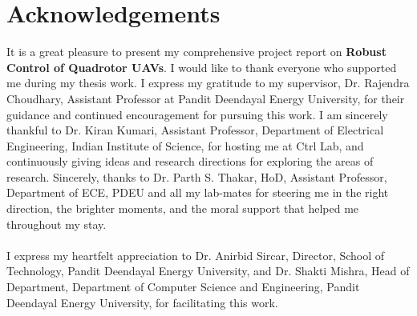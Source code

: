 \chapter*{\center \Large  Acknowledgements}
It is a great pleasure to present my comprehensive project report on \textbf{Robust Control of Quadrotor UAVs}. I would like to thank everyone who supported me during my thesis work. I express my gratitude to my supervisor, Dr. Rajendra Choudhary, Assistant Professor at Pandit Deendayal Energy University, for their guidance and continued encouragement for pursuing this work. I am sincerely thankful to Dr. Kiran Kumari, Assistant Professor, Department of Electrical Engineering, Indian Institute of Science, for hosting me at Ctrl Lab, and continuously giving ideas and research directions for exploring the areas of research. Sincerely, thanks to Dr. Parth S. Thakar, HoD, Assistant Professor, Department of ECE, PDEU and all my lab-mates for steering me in the right direction, the brighter moments, and the moral support that helped me throughout my stay.
\\
\\
\noindent
I express my heartfelt appreciation to Dr. Anirbid Sircar, Director, School of Technology, Pandit Deendayal Energy University, and Dr. Shakti Mishra, Head of Department, Department of Computer Science and Engineering, Pandit Deendayal Energy University, for facilitating this work.